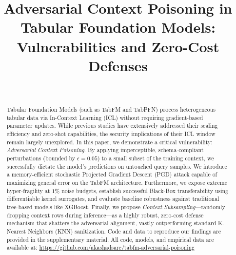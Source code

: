 \documentclass[conference]{IEEEtran}
\title{Adversarial Context Poisoning in Tabular Foundation Models:\\ Vulnerabilities and Zero-Cost Defenses}
\author{\IEEEauthorblockN{Akash Adsare}\\
\IEEEauthorblockA{\textit{B.E. Computer Engineering} \\
\textit{Sinhgad Institute of Technology (SIT), Lonavala} \\
\textit{Savitribai Phule Pune University (SPPU)}}
}
\begin{document}
\maketitle

\begin{abstract}
Tabular Foundation Models (such as TabFM and TabPFN) process heterogeneous tabular data via In-Context Learning (ICL) without requiring gradient-based parameter updates. While previous studies have extensively addressed their scaling efficiency and zero-shot capabilities, the security implications of their ICL window remain largely unexplored. In this paper, we demonstrate a critical vulnerability: \textit{Adversarial Context Poisoning}. By applying imperceptible, schema-compliant perturbations (bounded by $\epsilon=0.05$) to a small subset of the training context, we successfully dictate the model's predictions on untouched query samples. We introduce a memory-efficient stochastic Projected Gradient Descent (PGD) attack capable of maximizing general error on the TabFM architecture. Furthermore, we expose extreme hyper-fragility at $1\%$ noise budgets, establish successful Black-Box transferability using differentiable kernel surrogates, and evaluate baseline robustness against traditional tree-based models like XGBoost. Finally, we propose \textit{Context Subsampling}---randomly dropping context rows during inference---as a highly robust, zero-cost defense mechanism that shatters the adversarial alignment, vastly outperforming standard K-Nearest Neighbors (KNN) sanitization. Code and data to reproduce our findings are provided in the supplementary material.
All code, models, and empirical data are available at: \url{https://github.com/akashadsare/tabfm-adversarial-poisoning}
\end{abstract}









\end{document}
